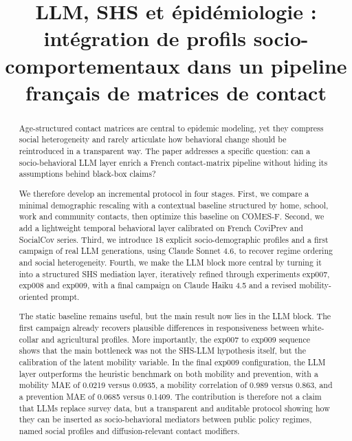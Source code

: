 \documentclass[ROIA,Unicode]{cedram}
\title[LLM, SHS et épidémiologie]{LLM, SHS et épidémiologie : intégration de profils socio-comportementaux dans un pipeline français de matrices de contact}
\author{\firstname{Martin} \lastname{Collins}}
\begin{document}
\begin{abstract}
Age-structured contact matrices are central to epidemic modeling, yet they compress social heterogeneity and rarely articulate how behavioral change should be reintroduced in a transparent way. The paper addresses a specific question: can a socio-behavioral LLM layer enrich a French contact-matrix pipeline without hiding its assumptions behind black-box claims?

We therefore develop an incremental protocol in four stages. First, we compare a minimal demographic rescaling with a contextual baseline structured by home, school, work and community contacts, then optimize this baseline on COMES-F. Second, we add a lightweight temporal behavioral layer calibrated on French CoviPrev and SocialCov series. Third, we introduce 18 explicit socio-demographic profiles and a first campaign of real LLM generations, using Claude Sonnet 4.6, to recover regime ordering and social heterogeneity. Fourth, we make the LLM block more central by turning it into a structured SHS mediation layer, iteratively refined through experiments exp007, exp008 and exp009, with a final campaign on Claude Haiku 4.5 and a revised mobility-oriented prompt.

The static baseline remains useful, but the main result now lies in the LLM block. The first campaign already recovers plausible differences in responsiveness between white-collar and agricultural profiles. More importantly, the exp007 to exp009 sequence shows that the main bottleneck was not the SHS-LLM hypothesis itself, but the calibration of the latent mobility variable. In the final exp009 configuration, the LLM layer outperforms the heuristic benchmark on both mobility and prevention, with a mobility MAE of 0.0219 versus 0.0935, a mobility correlation of 0.989 versus 0.863, and a prevention MAE of 0.0685 versus 0.1409. The contribution is therefore not a claim that LLMs replace survey data, but a transparent and auditable protocol showing how they can be inserted as socio-behavioral mediators between public policy regimes, named social profiles and diffusion-relevant contact modifiers.
\end{abstract}
\end{document}
